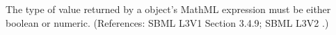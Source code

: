 The type of value returned by a \FunctionDefinition object's 
MathML expression must be either boolean or numeric.  (References: SBML L3V1 Section 3.4.9; SBML
L3V2 .)
